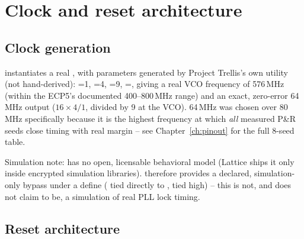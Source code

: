 \chapter{Clock and reset architecture}

\section{Clock generation}
\begin{center}
\end{center}

 instantiates a real , with
parameters generated by Project Trellis's own  utility
(not hand-derived): =1, =4,
=9, =, giving a real
VCO frequency of 576\,MHz (within the ECP5's documented 400--800\,MHz
range) and an exact, zero-error 64\,MHz output ($16 \times 4 / 1$,
divided by 9 at the VCO). 64\,MHz was chosen over 80\,MHz specifically
because it is the highest frequency at which \emph{all} measured P\&R
seeds close timing with real margin -- see Chapter~\ref{ch:pinout} for
the full 8-seed table.

Simulation note:  has no open, licensable behavioral
model (Lattice ships it only inside encrypted simulation libraries).
 therefore provides a declared,
simulation-only bypass under a  define (
tied directly to ,  tied high) -- this is
not, and does not claim to be, a simulation of real PLL lock timing.

\section{Reset architecture}
\begin{center}
\end{center}

